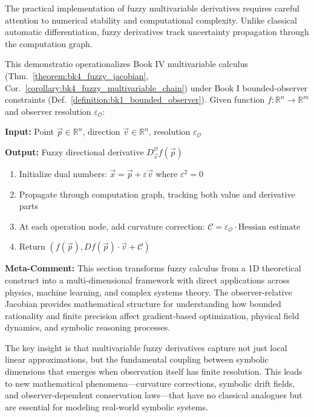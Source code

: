 The practical implementation of fuzzy multivariable derivatives requires careful attention to numerical stability and computational complexity. Unlike classical automatic differentiation, fuzzy derivatives track uncertainty propagation through the computation graph.

\begin{demonstratio}
\label{demonstratio:bk4_fuzzy_forward_mode}
This demonstratio operationalizes Book IV multivariable calculus (Thm.~\ref{theorem:bk4_fuzzy_jacobian}, Cor.~\ref{corollary:bk4_fuzzy_multivariable_chain}) under Book I bounded-observer constraints (Def.~\ref{definition:bk1_bounded_observer}).
Given function $f: \mathbb{R}^n \to \mathbb{R}^m$ and observer resolution $\varepsilon_{\mathcal{O}}$:

\textbf{Input:} Point $\vec{p} \in \mathbb{R}^n$, direction $\vec{v} \in \mathbb{R}^n$, resolution $\varepsilon_{\mathcal{O}}$

\textbf{Output:} Fuzzy directional derivative $D_{\vec{v}}^{\mathcal{O}} f(\vec{p})$

\begin{enumerate}
\item Initialize dual numbers: $\vec{x} = \vec{p} + \varepsilon \vec{v}$ where $\varepsilon^2 = 0$
\item Propagate through computation graph, tracking both value and derivative parts
\item At each operation node, add curvature correction: $\mathcal{C} = \varepsilon_{\mathcal{O}} \cdot \text{Hessian estimate}$
\item Return $(f(\vec{p}), Df(\vec{p}) \cdot \vec{v} + \mathcal{C})$
\end{enumerate}
\end{demonstratio}

\vspace{1em}
\textbf{Meta-Comment:} This section transforms fuzzy calculus from a 1D theoretical construct into a multi-dimensional framework with direct applications across physics, machine learning, and complex systems theory. The observer-relative Jacobian provides mathematical structure for understanding how bounded rationality and finite precision affect gradient-based optimization, physical field dynamics, and symbolic reasoning processes.

The key insight is that multivariable fuzzy derivatives capture not just local linear approximations, but the fundamental coupling between symbolic dimensions that emerges when observation itself has finite resolution. This leads to new mathematical phenomena---curvature corrections, symbolic drift fields, and observer-dependent conservation laws---that have no classical analogues but are essential for modeling real-world symbolic systems.

